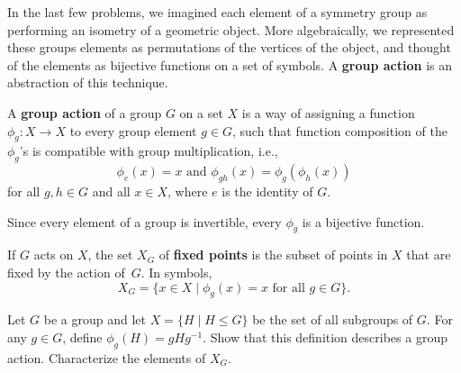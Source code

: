 In the last few problems, we imagined each element of a symmetry group as performing an isometry of a geometric object. More algebraically, we represented these groups elements as permutations of the vertices of the object, and thought of the elements as bijective functions on a set of symbols. A \textbf{group action} is an abstraction of this technique.

\begin{definition}\label{def:groupaction}
A \textbf{group action} of a group $G$ on a set $X$ is a way of assigning a function $\phi_g : X \longrightarrow X$ to every group element $g \in G$, such that function composition of the $\phi_g$'s is compatible with group multiplication, i.e.,
$$\phi_e(x) = x \mbox{ and }\phi_{gh}(x) = \phi_g(\phi_h(x))$$
for all $g,h \in G$ and all $x\in X$, where $e$ is the identity of $G$.
\begin{annotation}
\end{annotation}
\end{definition}

Since every element of a group is invertible, every $\phi_g$ is a bijective function.
\begin{annotation}
\end{annotation}

\begin{definition}
 If $G$ acts on $X$, the set $X_G$ of \textbf{fixed points} is the subset of points in $X$ that are fixed by the action of~$G$. In symbols, $$X_G =\{ x \in X \mid \phi_g(x) = x \mbox{ for all } g \in G \}.$$
\end{definition}

\begin{problem}
Let $G$ be a group and let $X = \{ H \mid H \leq G\}$ be the set of all subgroups of $G$.  For any $g \in G$, define $\phi_g(H) = gHg^{-1}$.  Show that this definition describes a group action.  Characterize the elements of $X_G$.
\end{problem}

